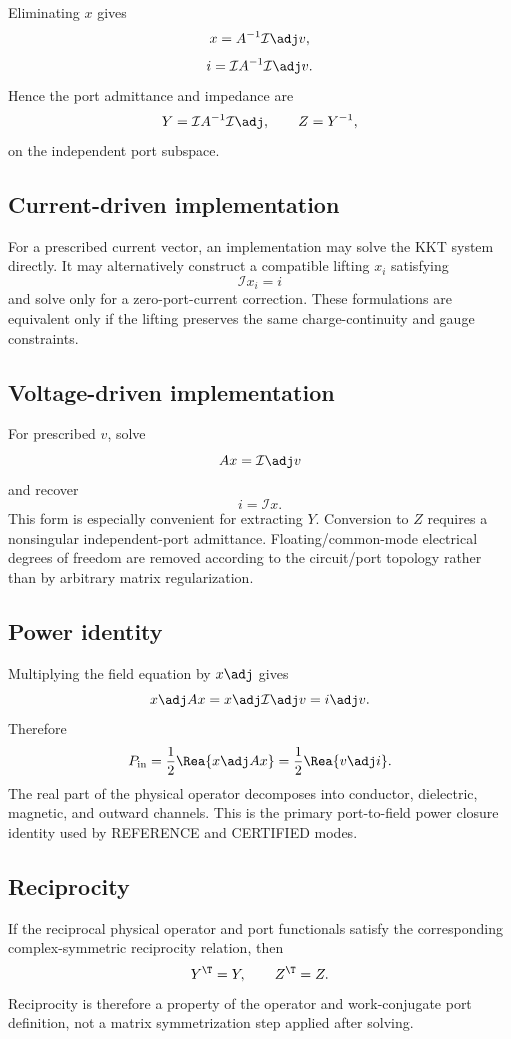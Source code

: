 Eliminating $x$ gives
\[
  x=A^{-1}\mathcal I\adj v,
\]
\[
  i
  =
  \mathcal I A^{-1}\mathcal I\adj v.
\]
Hence the port admittance and impedance are
\[
  Y
  =
  \mathcal I A^{-1}\mathcal I\adj,
  \qquad
  Z=Y^{-1},
  \label{eq:port-schur}
\]
on the independent port subspace.

\subsection{Current-driven implementation}

For a prescribed current vector, an implementation may solve the KKT system
directly. It may alternatively construct a compatible lifting $x_i$ satisfying
\[
  \mathcal I x_i=i
\]
and solve only for a zero-port-current correction. These formulations are
equivalent only if the lifting preserves the same charge-continuity and gauge
constraints.

\subsection{Voltage-driven implementation}

For prescribed $v$, solve
\[
  Ax=\mathcal I\adj v
\]
and recover
\[
  i=\mathcal I x.
\]
This form is especially convenient for extracting $Y$. Conversion to $Z$
requires a nonsingular independent-port admittance. Floating/common-mode
electrical degrees of freedom are removed according to the circuit/port
topology rather than by arbitrary matrix regularization.

\subsection{Power identity}

Multiplying the field equation by $x\adj$ gives
\[
  x\adj A x
  =
  x\adj\mathcal I\adj v
  =
  i\adj v.
\]
Therefore
\[
  P_{\rm in}
  =
  \frac12\Rea\{x\adj A x\}
  =
  \frac12\Rea\{v\adj i\}.
\]
The real part of the physical operator decomposes into conductor, dielectric,
magnetic, and outward channels. This is the primary port-to-field power closure
identity used by REFERENCE and CERTIFIED modes.

\subsection{Reciprocity}

If the reciprocal physical operator and port functionals satisfy the
corresponding complex-symmetric reciprocity relation, then
\[
  Y^\T=Y,\qquad Z^\T=Z.
\]
Reciprocity is therefore a property of the operator and work-conjugate port
definition, not a matrix symmetrization step applied after solving.

